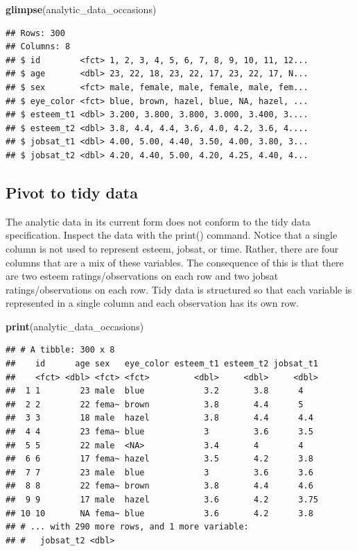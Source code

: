 \documentclass[
]{krantz}
\makeatletter
\newenvironment{Shaded}{\begin{snugshade}}{\end{snugshade}}
\newcommand{\KeywordTok}[1]{\textcolor[rgb]{0.27,0.27,0.27}{\textbf{#1}}}
\newcommand{\NormalTok}[1]{#1}
\newenvironment{kframe}{%
\medskip{}
\setlength{\fboxsep}{.8em}
 \def\at@end@of@kframe{}%
 \ifinner\ifhmode%
  \def\at@end@of@kframe{\end{minipage}}%
  \begin{minipage}{\columnwidth}%
 \fi\fi%
 \def\FrameCommand##1{\hskip\@totalleftmargin \hskip-\fboxsep
 \colorbox{shadecolor}{##1}\hskip-\fboxsep
     \hskip-\linewidth \hskip-\@totalleftmargin \hskip\columnwidth}%
 \MakeFramed {\advance\hsize-\width
   \@totalleftmargin\z@ \linewidth\hsize
   \@setminipage}}%
 {\par\unskip\endMakeFramed%
 \at@end@of@kframe}
\renewenvironment{Shaded}{\begin{kframe}}{\end{kframe}}
\makeatother
\begin{document}
\begin{Shaded}
\begin{Highlighting}[]
\KeywordTok{glimpse}\NormalTok{(analytic_data_occasions)}
\end{Highlighting}
\end{Shaded}

\begin{verbatim}
## Rows: 300
## Columns: 8
## $ id        <fct> 1, 2, 3, 4, 5, 6, 7, 8, 9, 10, 11, 12...
## $ age       <dbl> 23, 22, 18, 23, 22, 17, 23, 22, 17, N...
## $ sex       <fct> male, female, male, female, male, fem...
## $ eye_color <fct> blue, brown, hazel, blue, NA, hazel, ...
## $ esteem_t1 <dbl> 3.200, 3.800, 3.800, 3.000, 3.400, 3....
## $ esteem_t2 <dbl> 3.8, 4.4, 4.4, 3.6, 4.0, 4.2, 3.6, 4....
## $ jobsat_t1 <dbl> 4.00, 5.00, 4.40, 3.50, 4.00, 3.80, 3...
## $ jobsat_t2 <dbl> 4.20, 4.40, 5.00, 4.20, 4.25, 4.40, 4...
\end{verbatim}

\hypertarget{pivot-to-tidy-data-2}{%
\subsection{Pivot to tidy data}\label{pivot-to-tidy-data-2}}

The analytic data in its current form does not conform to the tidy data specification. Inspect the data with the print() command.
Notice that a single column is not used to represent esteem, jobsat, or time. Rather, there are four columns that are a mix of these variables. The consequence of this is that there are two esteem ratings/observations on each row and two jobsat ratings/observations on each row. Tidy data is structured so that each variable is represented in a single column and each observation has its own row.

\begin{Shaded}
\begin{Highlighting}[]
\KeywordTok{print}\NormalTok{(analytic_data_occasions)}
\end{Highlighting}
\end{Shaded}

\begin{verbatim}
## # A tibble: 300 x 8
##    id      age sex   eye_color esteem_t1 esteem_t2 jobsat_t1
##    <fct> <dbl> <fct> <fct>         <dbl>     <dbl>     <dbl>
##  1 1        23 male  blue            3.2       3.8      4   
##  2 2        22 fema~ brown           3.8       4.4      5   
##  3 3        18 male  hazel           3.8       4.4      4.4 
##  4 4        23 fema~ blue            3         3.6      3.5 
##  5 5        22 male  <NA>            3.4       4        4   
##  6 6        17 fema~ hazel           3.5       4.2      3.8 
##  7 7        23 male  blue            3         3.6      3.6 
##  8 8        22 fema~ brown           3.8       4.4      4.6 
##  9 9        17 male  hazel           3.6       4.2      3.75
## 10 10       NA fema~ blue            3.6       4.2      3.8 
## # ... with 290 more rows, and 1 more variable:
## #   jobsat_t2 <dbl>
\end{verbatim}
\end{document}
